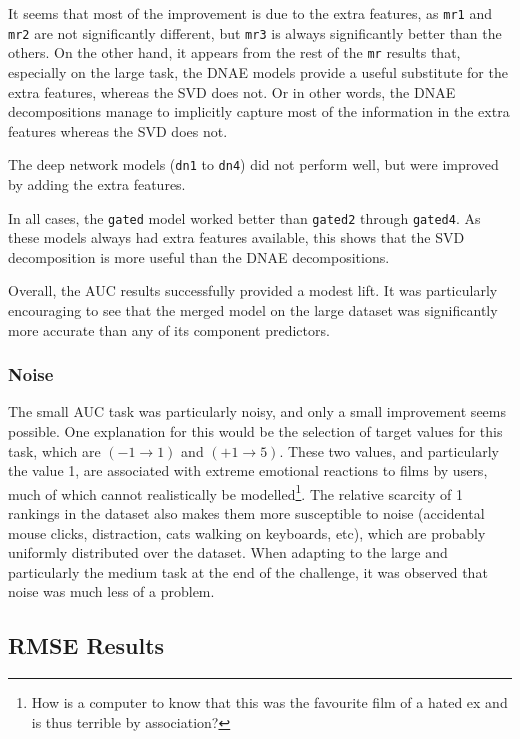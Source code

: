 \documentclass{article}
\begin{document}
It seems that most of the improvement is due to the extra features, as \texttt{mr1} and \texttt{mr2} are not significantly different, but \texttt{mr3} is always significantly better than the others.  On the other hand, it appears from the rest of the \texttt{mr} results that, especially on the large task, the DNAE models provide a useful substitute for the extra features, whereas the SVD does not.  Or in other words, the DNAE decompositions manage to implicitly capture most of the information in the extra features whereas the SVD does not.

The deep network models (\texttt{dn1} to \texttt{dn4}) did not perform well, but were improved by adding the extra features.

In all cases, the \texttt{gated} model worked better than \texttt{gated2} through \texttt{gated4}.  As these models always had extra features available, this shows that the SVD decomposition is more useful than the DNAE decompositions.

Overall, the AUC results successfully provided a modest lift.  It was particularly encouraging to see that the merged model on the large dataset was significantly more accurate than any of its component predictors.

\subsubsection{Noise}

The small AUC task was particularly noisy, and only a small improvement seems possible.
One explanation for this would be the selection of target values for this task, which are $(-1 \rightarrow 1)$ and $(+1 \rightarrow 5)$.  
These two values, and particularly the value 1, are associated with extreme emotional reactions to films by users, much of which cannot realistically be modelled\footnote{How is a computer to know that this was the favourite film of a hated ex and is thus terrible by association?}.
The relative scarcity of 1 rankings in the dataset also makes them more susceptible to noise (accidental mouse clicks, distraction, cats walking on keyboards, etc), which are probably uniformly distributed over the dataset.
When adapting to the large and particularly the medium task at the end of the challenge, it was observed that noise was much less of a problem.

\subsection{RMSE Results}
\end{document}
